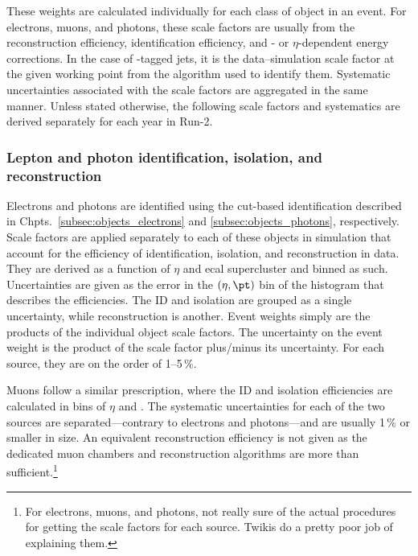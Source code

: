 These weights are calculated individually for each class of object in an event. For electrons, muons, and photons, these scale factors are usually from the reconstruction efficiency, identification efficiency, and \pt- or $\eta$-dependent energy corrections. In the case of \Pbottom-tagged \glspl{jet}, it is the data--simulation scale factor at the given working point from the algorithm used to identify them. Systematic uncertainties associated with the scale factors are aggregated in the same manner. Unless stated otherwise, the following scale factors and systematics are derived separately for each year in Run-2.




\subsubsection{Lepton and photon identification, isolation, and reconstruction}
\label{subsubsec:htoinv_lepton_id_iso_reco_systs}

Electrons and photons are identified using the cut-based identification described in Chpts.~\ref{subsec:objects_electrons} and \ref{subsec:objects_photons}, respectively. Scale factors are applied separately to each of these objects in simulation that account for the efficiency of identification, isolation, and reconstruction in data. They are derived as a function of $\eta$ and \acrshort{ecal} supercluster \pt and binned as such. Uncertainties are given as the error in the $(\eta, \pt)$ bin of the histogram that describes the efficiencies. The ID and isolation are grouped as a single uncertainty, while reconstruction is another. Event weights simply are the products of the individual object scale factors. The uncertainty on the event weight is the product of the scale factor plus/minus its uncertainty. For each source, they are on the order of 1--5\,\%.



Muons follow a similar prescription, where the ID and isolation efficiencies are calculated in bins of $\eta$ and \pt. The systematic uncertainties for each of the two sources are separated---contrary to electrons and photons---and are usually 1\,\% or smaller in size. An equivalent reconstruction efficiency is not given as the dedicated muon chambers and reconstruction algorithms are more than sufficient.\footnote{For electrons, muons, and photons, not really sure of the actual procedures for getting the scale factors for each source. Twikis do a pretty poor job of explaining them.}

